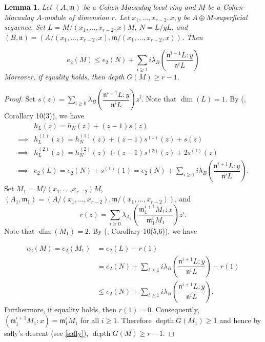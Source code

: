 \documentclass[11pt]{amsart}
\theoremstyle{plain}
\newtheorem{lemma}[theorem]{Lemma}
\newcommand{\m}{\mathfrak{m}}
\newcommand{\n}{\mathfrak{n}}
\newcommand{\depth}{\operatorname{depth}}
\theoremstyle{plain}
\begin{document}
\begin{lemma}\label{kam}
   Let $(A,\mathfrak{m})$ be a Cohen-Macaulay local ring and $M$ be a Cohen-Macaulay $A$-module of dimension $r$. Let $x_1,\ldots ,x_{r-2},x,y$ be $A\oplus M$-superficial sequence. Set  $L=M/(x_1,\ldots ,x_{r-2},x)M$, $N=L/yL$, and  $(B,\n)=(A/(x_1,\ldots ,x_{r-2},x),\m/(x_1,\ldots ,x_{r-2},x))$. Then
   
   $$e_2(M)\leq e_2(N) + \sum_{i\geq 1}i\lambda_B\left(\frac{{\n}^{i+1}L:y}{{\n}^iL}\right) $$ Moreover, if equality holds, then depth $G(M)\geq r-1$.
\end{lemma}
\begin{proof}
  Set $ s(z)=\sum_{i\geq 0}\lambda_B \left(\dfrac{\n^{i+1}L:y}{\n^iL}\right)z^i$. Note that $\dim(L)=1.$ By (\cite{HCCMM}, Corollary 10(3)), we have 
    \begin{equation}\label{eq12}
        \begin{split}
           & h_{L}(z)=h_{N}(z)+(z-1)s(z)\\
           \implies &  h^{(1)}_L(z)=h^{(1)}_{N}(z)+(z-1)s^{(1)}(z)+s(z)\\
           \implies & h^{(2)}_{L}(z)=h^{(2)}_{N}(z)+(z-1)s^{(2)}(z)+2s^{(1)}(z)\\
           \implies & e_2(L)=e_2(N)+s^{(1)}(1)=e_2(N)+\sum_{i\geq 1}i\lambda_B \left(\dfrac{\n^{i+1}L:y}{\n^iL}\right).
        \end{split}
    \end{equation}
Set  $M_1=M/(x_1,\ldots ,x_{r-2})M$, $(A_1,\m_1)=(A/(x_1,\ldots ,x_{r-2}),\m/(x_1,\ldots ,x_{r-2}))$, and  $$ r(z)=\sum_{i\geq 0}\lambda_{A_1} \left(\dfrac{\m^{i+1}_1M_1:x}{\m^i_1M_1}\right)z^i.$$ Note that $\dim(M_1)=2.$ By (\cite{HCCMM}, Corollary 10(5,6)), we have 

\begin{equation}
    \begin{split}
        e_2(M)=e_2(M_1) &=e_2(L)-r(1)\\ & = e_2(N)+\sum_{i\geq 1}i\lambda_B \left(\dfrac{\n^{i+1}L:y}{\n^iL}\right)-r(1) \\ & \leq e_2(N)+\sum_{i\geq 1}i\lambda_B \left(\dfrac{\n^{i+1}L:y}{\n^iL}\right).
    \end{split}
\end{equation}
Furthermore, if equality holds, then $r(1)=0$. Consequently, $(\mathfrak{m}^{i+1}_1M_1:x)=\mathfrak{m}^i_1M_1$ for all $i\geq1$. Therefore $\operatorname{depth}G(M_1)\geq1$ and hence by sally's descent (see \ref{sally}), $\depth G(M)\geq r-1.$ 

\end{proof}
\end{document}

